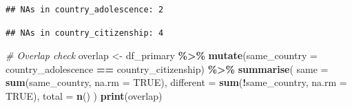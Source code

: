 \documentclass[
]{article}
\newenvironment{Shaded}{\begin{snugshade}}{\end{snugshade}}
\newcommand{\AttributeTok}[1]{\textcolor[rgb]{0.13,0.29,0.53}{#1}}
\newcommand{\CommentTok}[1]{\textcolor[rgb]{0.56,0.35,0.01}{\textit{#1}}}
\newcommand{\ConstantTok}[1]{\textcolor[rgb]{0.56,0.35,0.01}{#1}}
\newcommand{\FunctionTok}[1]{\textcolor[rgb]{0.13,0.29,0.53}{\textbf{#1}}}
\newcommand{\NormalTok}[1]{#1}
\newcommand{\OtherTok}[1]{\textcolor[rgb]{0.56,0.35,0.01}{#1}}
\newcommand{\SpecialCharTok}[1]{\textcolor[rgb]{0.81,0.36,0.00}{\textbf{#1}}}
\newcommand{\StringTok}[1]{\textcolor[rgb]{0.31,0.60,0.02}{#1}}
\begin{document}
\begin{Shaded}
\end{Shaded}

\begin{verbatim}
## NAs in country_adolescence: 2
\end{verbatim}

\begin{Shaded}
\end{Shaded}

\begin{verbatim}
## NAs in country_citizenship: 4
\end{verbatim}

\begin{Shaded}
\begin{Highlighting}[]
\CommentTok{\# Overlap check}
\NormalTok{overlap }\OtherTok{\textless{}{-}}\NormalTok{ df\_primary }\SpecialCharTok{\%\textgreater{}\%}
  \FunctionTok{mutate}\NormalTok{(}\AttributeTok{same\_country =}\NormalTok{ country\_adolescence }\SpecialCharTok{==}\NormalTok{ country\_citizenship) }\SpecialCharTok{\%\textgreater{}\%}
  \FunctionTok{summarise}\NormalTok{(}
    \AttributeTok{same =} \FunctionTok{sum}\NormalTok{(same\_country, }\AttributeTok{na.rm =} \ConstantTok{TRUE}\NormalTok{),}
    \AttributeTok{different =} \FunctionTok{sum}\NormalTok{(}\SpecialCharTok{!}\NormalTok{same\_country, }\AttributeTok{na.rm =} \ConstantTok{TRUE}\NormalTok{),}
    \AttributeTok{total =} \FunctionTok{n}\NormalTok{()}
\NormalTok{  )}
\FunctionTok{print}\NormalTok{(overlap)}
\end{Highlighting}
\end{Shaded}
\end{document}
